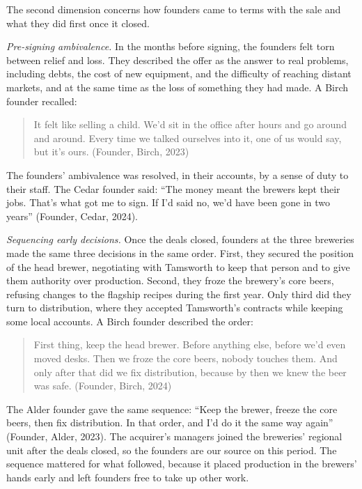 \documentclass[12pt]{article}
\begin{document}
The second dimension concerns how founders came to terms with the sale and what they did first once it closed.

\textit{Pre-signing ambivalence.} In the months before signing, the founders felt torn between relief and loss. They described the offer as the answer to real problems, including debts, the cost of new equipment, and the difficulty of reaching distant markets, and at the same time as the loss of something they had made. A Birch founder recalled:

\begin{quote}
It felt like selling a child. We'd sit in the office after hours and go around and around. Every time we talked ourselves into it, one of us would say, but it's ours. (Founder, Birch, 2023)
\end{quote}

\noindent The founders' ambivalence was resolved, in their accounts, by a sense of duty to their staff. The Cedar founder said: ``The money meant the brewers kept their jobs. That's what got me to sign. If I'd said no, we'd have been gone in two years'' (Founder, Cedar, 2024).

\textit{Sequencing early decisions.} Once the deals closed, founders at the three breweries made the same three decisions in the same order. First, they secured the position of the head brewer, negotiating with Tamsworth to keep that person and to give them authority over production. Second, they froze the brewery's core beers, refusing changes to the flagship recipes during the first year. Only third did they turn to distribution, where they accepted Tamsworth's contracts while keeping some local accounts. A Birch founder described the order:

\begin{quote}
First thing, keep the head brewer. Before anything else, before we'd even moved desks. Then we froze the core beers, nobody touches them. And only after that did we fix distribution, because by then we knew the beer was safe. (Founder, Birch, 2024)
\end{quote}

\noindent The Alder founder gave the same sequence: ``Keep the brewer, freeze the core beers, then fix distribution. In that order, and I'd do it the same way again'' (Founder, Alder, 2023). The acquirer's managers joined the breweries' regional unit after the deals closed, so the founders are our source on this period. The sequence mattered for what followed, because it placed production in the brewers' hands early and left founders free to take up other work.
\end{document}
